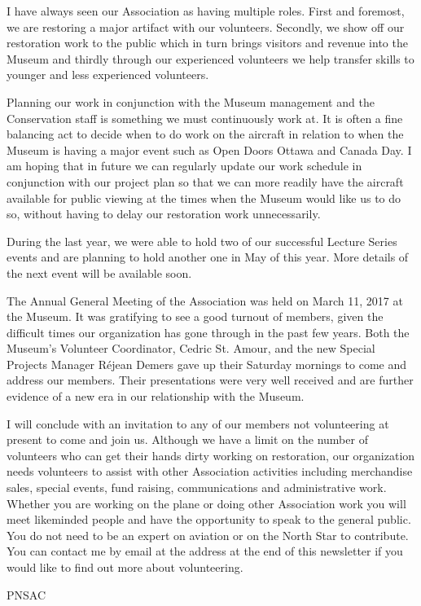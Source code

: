 I have always seen our Association as having multiple roles. First and foremost,
we are restoring a major artifact with our volunteers. Secondly, we show off our
restoration work to the public which in turn brings visitors and revenue into
the Museum and thirdly through our experienced volunteers we help transfer
skills to younger and less experienced volunteers.

Planning our work in conjunction with the Museum management and the Conservation
staff is something we must continuously work at. It is often a fine balancing
act to decide when to do work on the aircraft in relation to when the Museum is
having a major event such as Open Doors Ottawa and Canada Day. I am hoping that
in future we can regularly update our work schedule in conjunction with our
project plan so that we can more readily have the aircraft available for public
viewing at the times when the Museum would like us to do so, without having to
delay our restoration work unnecessarily.

During the last year, we were able to hold two of our successful Lecture Series
events and are planning to hold another one in May of this year. More details of
the next event will be available soon.

The Annual General Meeting of the Association was held on March 11, 2017 at the 
Museum. It was gratifying to see a good turnout of members, given the difficult
times our organization has gone through in the past few years. Both the Museum's 
Volunteer Coordinator, Cedric St. Amour, and the new Special Projects Manager 
R\'{e}jean Demers gave up their Saturday mornings to come and address our members. 
Their presentations were very well received and are further evidence of a new 
era in our relationship with the Museum.

I will conclude with an invitation to any of our members not volunteering at
present to come and join us. Although we have a limit on the number of
volunteers who can get their hands dirty working on restoration, our organization 
needs  volunteers to assist with other Association activities including merchandise
sales, special events, fund raising, communications and administrative work. Whether
you are working on the plane or doing other Association work you will meet likeminded
people and have the opportunity to speak to the general public. You do not need to 
be an expert on aviation or on the North Star to contribute. You can contact me by 
email at the address at the end of this newsletter if you would like to find out 
more about volunteering.

\begin{footnotesize}
    \raggedleft PNSAC\\
\end{footnotesize}



